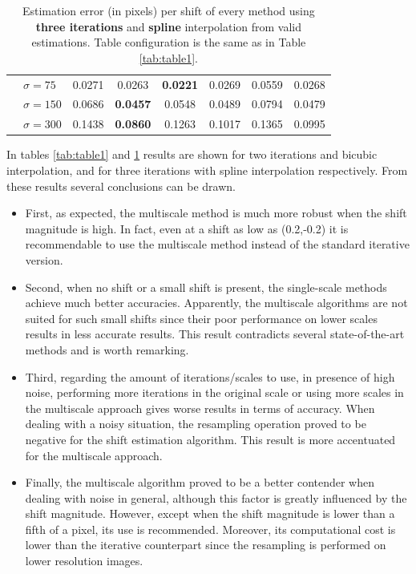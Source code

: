 \begin{table}[t]
\begin{tabular}{c|l||c|c|c|c|c|c}
 & $\sigma=75$ & 0.0271 & 0.0263 & \textbf{0.0221} & 0.0269 & 0.0559 & 0.0268 \\ 
 & $\sigma=150$ & 0.0686 & \textbf{0.0457} & 0.0548 & 0.0489 & 0.0794 & 0.0479 \\ 
 & $\sigma=300$ & 0.1438 & \textbf{0.0860} & 0.1263 & 0.1017 & 0.1365 & 0.0995 \\ 
\hline
\end{tabular}
	\caption{\small{Estimation error (in pixels) per shift of every method using \textbf{three iterations} and \textbf{spline} interpolation from valid estimations. Table configuration is the same as in Table \ref{tab:table1}.}}
	\label{tab:table2}
\end{table}

%
In tables \ref{tab:table1} and \ref{tab:table2} results are shown for two iterations and bicubic interpolation, and for three iterations with spline interpolation respectively. %
%
From these results several conclusions can be drawn.
\begin{itemize}
\item First, as expected, the multiscale method is much more robust when the shift magnitude is high. In fact, even at a shift as low as (0.2,-0.2) it is recommendable to use the multiscale method instead of the standard iterative version. 
\item Second, when no shift or  a small shift is present, the single-scale methods achieve much better accuracies. Apparently, the multiscale algorithms are not suited for such small shifts since their poor performance on lower scales results in less accurate results. This result contradicts several state-of-the-art methods and is worth remarking. 
\item Third, regarding the amount of iterations/scales to use, in presence of high noise, performing more iterations in the original scale or using more scales in the multiscale approach gives worse results in terms of accuracy. When dealing with a noisy situation, the resampling operation proved to be negative for the shift estimation algorithm. This result is more accentuated for the multiscale approach.
\item Finally, the multiscale algorithm proved to be a better contender when dealing with noise in general, although this factor is greatly influenced by the shift magnitude. However, except when the shift magnitude is lower than a fifth of a pixel, its use is recommended. Moreover, its computational cost is lower than the iterative counterpart since the resampling is performed on lower resolution images.
\end{itemize}


